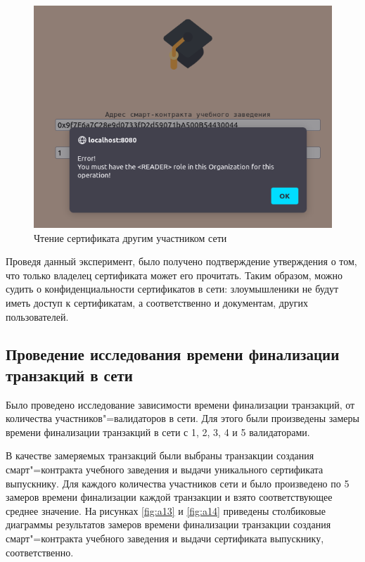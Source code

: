 \begin{figure}[h!]
	\centering
	\includegraphics[width=\textwidth]{img/cert_not_seen.png}
	\caption{Чтение сертификата другим участником сети}
	\label{fig:a12}
\end{figure}

Проведя данный эксперимент, было получено подтверждение утверждения о том, что только владелец сертификата может его прочитать. Таким образом, можно судить о конфиденциальности сертификатов в сети: злоумышленики не будут иметь доступ к сертификатам, а соответственно и документам, других пользователей.

\subsection{Проведение исследования времени финализации транзакций в сети}

Было проведено исследование зависимости времени финализации транзакций, от количества участников"=валидаторов в сети. Для этого были произведены замеры времени финализации транзакций в сети с 1, 2, 3, 4 и 5 валидаторами.

В качестве замеряемых транзакций были выбраны транзакции создания смарт"=контракта учебного заведения и выдачи уникального сертификата выпускнику. Для каждого количества участников сети и было произведено по 5 замеров времени финализации каждой транзакции и взято соответствующее среднее значение. На рисунках \ref{fig:a13} и \ref{fig:a14} приведены столбиковые диаграммы результатов замеров времени финализации транзакции создания смарт"=контракта учебного заведения и выдачи сертификата выпускнику, соответственно.


